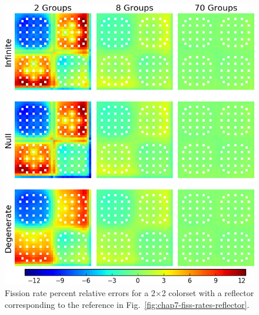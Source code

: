 \begin{figure}[h!]
\centering
\includegraphics[width=\linewidth]{figures/quantification/reflector/fiss-err}
\caption[Fission rate errors for a 2$\times$2 colorset with a reflector]{Fission rate percent relative errors for a 2$\times$2 colorset with a reflector corresponding to the reference in Fig.~\ref{fig:chap7-fiss-rates-reflector}.}
\label{fig:chap8-reflector-fiss-err}
\end{figure}

\clearpage

